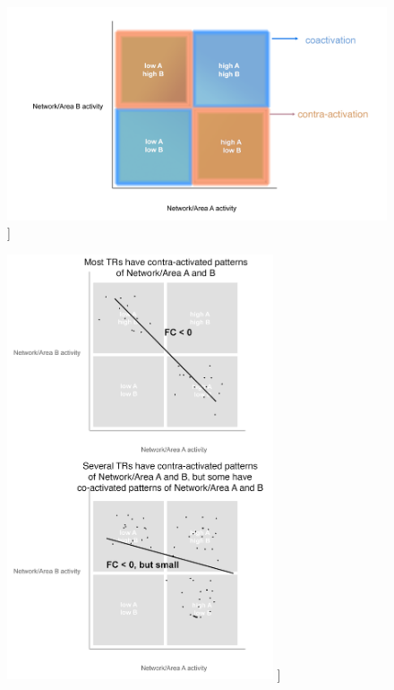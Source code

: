 \documentclass[phd,tocprelim]{cornell}
\renewcommand{\caption}[1]{\singlespacing\hangcaption{#1}\normalspacing}
\begin{document}
\vfill
\begin{figure}[h!]
		\ContinuedFloat
		\captionsetup{labelformat=adja-page}
    \centering
    \includegraphics[width=1\textwidth]{chapter2/SupplementaryFig15a.png}
    \caption[]{}
\end{figure}
\null
\vfill
\clearpage
\null
\vfill
\begin{figure}[h!]
		\ContinuedFloat
		\captionsetup{labelformat=adja-page}
    \centering
    \includegraphics[width=0.7\textwidth]{chapter2/SupplementaryFig15b.png}
    \caption[]{}
\end{figure}
\end{document}
